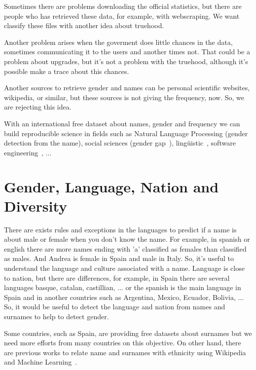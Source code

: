 \documentclass[a4paper]{article}
\begin{document}
Sometimes there are problems downloading the official statistics, but
there are people who has retrieved these data, for example, with
webscraping. We want classify these files with another idea about
truehood.

Another problem arises when the goverment does little chances in the
data, sometimes communicating it to the users and another times
not. That could be a problem about upgrades, but it's not a problem
with the truehood, although it's possible make a trace about this
chances.

Another sources to retrieve gender and names can be personal
scientific websites, wikipedia, or similar, but these sources is not
giving the frequency, now. So, we are rejecting this idea. 

With an international free dataset about names, gender and frequency
we can build reproducible science in fields such as Natural Language
Processing (gender detection from the name), social sciences (gender
gap~\cite{holman2018gender,mislove2011understanding}),
lingüistic~\cite{lawson2005russian,krueger1962mongolian,van2020gender},
software engineering~\cite{vasilescu2012gender}, ...


\section{Gender, Language, Nation and Diversity}
\label{sec:diversity}

There are exists rules and exceptions in the languages to predict if a
name is about male or female when you don't know the name. For
example, in spanish or english there are more names ending with 'a'
classified as females than classified as males. And Andrea is female
in Spain and male in Italy. So, it's useful to understand the language
and culture associated with a name. Language is close to nation, but
there are differences, for example, in Spain there are several
languages basque, catalan, castillian, ... or the spanish is the main
language in Spain and in another countries such as Argentina, Mexico,
Ecuador, Bolivia, ... So, it would be useful to detect the language
and nation from names and surnames to help to detect gender.

Some countries, such as Spain, are providing free datasets about
surnames but we need more efforts from many countries on this
objective. On other hand, there are previous works to relate name and
surnames with ethnicity using Wikipedia and Machine
Learning~\cite{ambekar2009name}.
\end{document}
